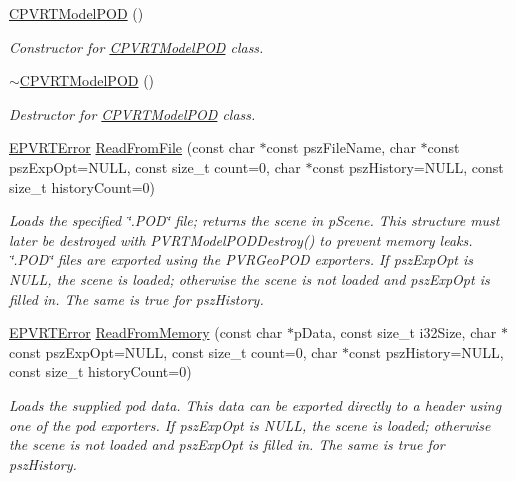 \begin{DoxyCompactItemize}
\item 
\hyperlink{class_c_p_v_r_t_model_p_o_d_ae04d9314e829bd539283627a9e2508dd}{C\+P\+V\+R\+T\+Model\+P\+O\+D} ()
\begin{DoxyCompactList}\small\item\em Constructor for \hyperlink{class_c_p_v_r_t_model_p_o_d}{C\+P\+V\+R\+T\+Model\+P\+O\+D} class. \end{DoxyCompactList}\item 
\hyperlink{class_c_p_v_r_t_model_p_o_d_ac5f89fab9bfc45030a2936ee9e2d9710}{$\sim$\+C\+P\+V\+R\+T\+Model\+P\+O\+D} ()
\begin{DoxyCompactList}\small\item\em Destructor for \hyperlink{class_c_p_v_r_t_model_p_o_d}{C\+P\+V\+R\+T\+Model\+P\+O\+D} class. \end{DoxyCompactList}\item 
\hyperlink{_p_v_r_t_error_8h_a9e837ff1a83f3a5f332bc4cc78454608}{E\+P\+V\+R\+T\+Error} \hyperlink{class_c_p_v_r_t_model_p_o_d_abe43b961eabe1c9db94545b97c84c71f}{Read\+From\+File} (const char $\ast$const psz\+File\+Name, char $\ast$const psz\+Exp\+Opt=N\+U\+L\+L, const size\+\_\+t count=0, char $\ast$const psz\+History=N\+U\+L\+L, const size\+\_\+t history\+Count=0)
\begin{DoxyCompactList}\small\item\em Loads the specified \char`\"{}.\+P\+O\+D\char`\"{} file; returns the scene in p\+Scene. This structure must later be destroyed with P\+V\+R\+T\+Model\+P\+O\+D\+Destroy() to prevent memory leaks. \char`\"{}.\+P\+O\+D\char`\"{} files are exported using the P\+V\+R\+Geo\+P\+O\+D exporters. If psz\+Exp\+Opt is N\+U\+L\+L, the scene is loaded; otherwise the scene is not loaded and psz\+Exp\+Opt is filled in. The same is true for psz\+History. \end{DoxyCompactList}\item 
\hyperlink{_p_v_r_t_error_8h_a9e837ff1a83f3a5f332bc4cc78454608}{E\+P\+V\+R\+T\+Error} \hyperlink{class_c_p_v_r_t_model_p_o_d_a83eecfad3cea65bae9befa3cbde20c88}{Read\+From\+Memory} (const char $\ast$p\+Data, const size\+\_\+t i32\+Size, char $\ast$const psz\+Exp\+Opt=N\+U\+L\+L, const size\+\_\+t count=0, char $\ast$const psz\+History=N\+U\+L\+L, const size\+\_\+t history\+Count=0)
\begin{DoxyCompactList}\small\item\em Loads the supplied pod data. This data can be exported directly to a header using one of the pod exporters. If psz\+Exp\+Opt is N\+U\+L\+L, the scene is loaded; otherwise the scene is not loaded and psz\+Exp\+Opt is filled in. The same is true for psz\+History. \end{DoxyCompactList}\item 

\end{DoxyCompactItemize}
